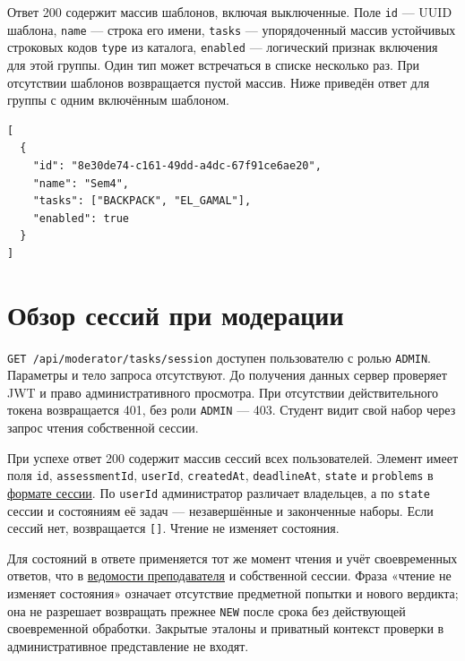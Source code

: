\documentclass[12pt,a4paper]{article}
\begin{document}
Ответ 200 содержит массив шаблонов, включая выключенные. Поле \texttt{id} --- UUID шаблона, \texttt{name} --- строка его имени, \texttt{tasks} --- упорядоченный массив устойчивых строковых кодов \texttt{type} из каталога, \texttt{enabled} --- логический признак включения для этой группы. Один тип может встречаться в списке несколько раз. При отсутствии шаблонов возвращается пустой массив. Ниже приведён ответ для группы с одним включённым шаблоном.

\begin{verbatim}
[
  {
    "id": "8e30de74-c161-49dd-a4dc-67f91ce6ae20",
    "name": "Sem4",
    "tasks": ["BACKPACK", "EL_GAMAL"],
    "enabled": true
  }
]
\end{verbatim}

\section{Обзор сессий при модерации}\label{ux43eux431ux437ux43eux440-ux441ux435ux441ux441ux438ux439-ux43fux440ux438-ux43cux43eux434ux435ux440ux430ux446ux438ux438}

\hypertarget{обзор-сессий-при-модерации}{}

\texttt{GET /\allowbreak{}api/\allowbreak{}moderator/\allowbreak{}tasks/\allowbreak{}session} доступен пользователю с ролью \texttt{ADMIN}. Параметры и тело запроса отсутствуют. До получения данных сервер проверяет JWT и право административного просмотра. При отсутствии действительного токена возвращается 401, без роли \texttt{ADMIN} --- 403. Студент видит свой набор через запрос чтения собственной сессии.

При успехе ответ 200 содержит массив сессий всех пользователей. Элемент имеет поля \texttt{id}, \texttt{assessment\allowbreak{}Id}, \texttt{userId}, \texttt{createdAt}, \texttt{deadlineAt}, \texttt{state} и \texttt{problems} в {\hyperlink{1-создание-сессии}{формате сессии}}. По \texttt{userId} администратор различает владельцев, а по \texttt{state} сессии и состояниям её задач --- незавершённые и законченные наборы. Если сессий нет, возвращается \texttt{{[}{]}}. Чтение не изменяет состояния.

Для состояний в ответе применяется тот же момент чтения и учёт своевременных ответов, что в {\hyperlink{результаты-контрольного-мероприятия}{ведомости преподавателя}} и собственной сессии. Фраза «чтение не изменяет состояния» означает отсутствие предметной попытки и нового вердикта; она не разрешает возвращать прежнее \texttt{NEW} после срока без действующей своевременной обработки. Закрытые эталоны и приватный контекст проверки в административное представление не входят.
\end{document}
